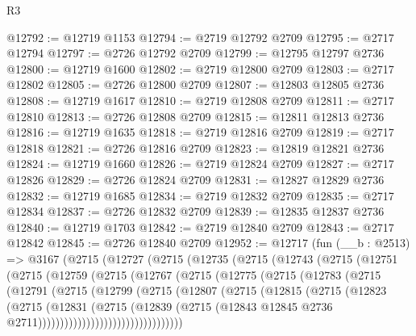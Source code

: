 \begin{lexlean}{R3}
\begin{coremodule}
@12792 := @12719 @1153
@12794 := @2719 @12792 @2709
@12795 := @2717 @12794
@12797 := @2726 @12792 @2709
@12799 := @12795 @12797 @2736
@12800 := @12719 @1600
@12802 := @2719 @12800 @2709
@12803 := @2717 @12802
@12805 := @2726 @12800 @2709
@12807 := @12803 @12805 @2736
@12808 := @12719 @1617
@12810 := @2719 @12808 @2709
@12811 := @2717 @12810
@12813 := @2726 @12808 @2709
@12815 := @12811 @12813 @2736
@12816 := @12719 @1635
@12818 := @2719 @12816 @2709
@12819 := @2717 @12818
@12821 := @2726 @12816 @2709
@12823 := @12819 @12821 @2736
@12824 := @12719 @1660
@12826 := @2719 @12824 @2709
@12827 := @2717 @12826
@12829 := @2726 @12824 @2709
@12831 := @12827 @12829 @2736
@12832 := @12719 @1685
@12834 := @2719 @12832 @2709
@12835 := @2717 @12834
@12837 := @2726 @12832 @2709
@12839 := @12835 @12837 @2736
@12840 := @12719 @1703
@12842 := @2719 @12840 @2709
@12843 := @2717 @12842
@12845 := @2726 @12840 @2709
@12952 := @12717
    (fun (__b : @2513) =>
    @3167
      (@2715
        (@12727
          (@2715
            (@12735
              (@2715
                (@12743
                  (@2715
                    (@12751
                      (@2715
                        (@12759
                          (@2715
                            (@12767
                              (@2715
                                (@12775
                                  (@2715
                                    (@12783
                                      (@2715
                                        (@12791
                                          (@2715
                                            (@12799
                                              (@2715
                                                (@12807
                                                  (@2715
                                                    (@12815
                                                      (@2715
                                                        (@12823
                                                          (@2715
                                                            (@12831
                                                              (@2715
                                                                (@12839
                                                                  (@2715
                                                                    (@12843
                                                                      @12845
                                                                      @2736
                                                                      @2711)))))))))))))))))))))))))))))))))

\end{coremodule}
\end{lexlean}
